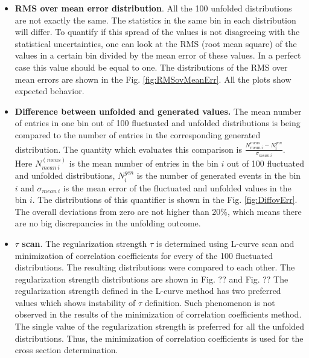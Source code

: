 \begin{itemize}
 \item \textbf{RMS over mean error distribution}. All the 100 unfolded distributions are not exactly the same. The statistics in the same bin in each
 distribution will differ. To quantify if this spread of the values is not disagreeing with the statistical uncertainties, one can look at the 
 RMS (root mean square) of the values in a certain bin divided by the mean error of these values. In a perfect case this value should be equal to one.
 The distributions of the RMS over mean errors are shown in the Fig. \ref{fig:RMSovMeanErr}. All the plots show expected behavior.
 
 \item \textbf{Difference between unfolded and generated values.} The mean number of entries in one bin out of 100 fluctuated and unfolded distributions
 is being compared to the number of entries in the corresponding generated distribution. The quantity which evaluates this comparison is
 $\frac{N^{meas}_{mean\:i} - N^{gen}_{i}}{\sigma_{mean\:i}}$. Here $N^(meas)_{mean\:i}$ is the mean number of entries in the bin $i$ out of 100 fluctuated and unfolded distributions,
 $N^{gen}_{i}$ is the number of generated events in the bin $i$ and $\sigma_{mean\:i}$ is the mean error of the fluctuated and unfolded values 
 in the bin $i$. The distributions of this quantifier is shown in the Fig. \ref{fig:DiffovErr}. The overall deviations from zero are not
 higher than 20\%, which means there are no big discrepancies in the unfolding outcome.
 
 \item \textbf{$\tau$ scan}. The regularization strength $\tau$ is determined using L-curve scan and minimization of correlation coefficients for every
 of the 100 fluctuated distributions. The resulting distributions were compared to each other. The regularization strength distributions are shown in
 Fig. ?? and Fig. ?? The regularization strength defined in the L-curve method has two preferred values which shows instability of $\tau$ definition.
 Such phenomenon is not observed in the results of the minimization of correlation coefficients method. The single value of the regularization strength
 is preferred for all the unfolded distributions. Thus, the minimization of correlation coefficients is used for the cross section determination.

\end{itemize}

